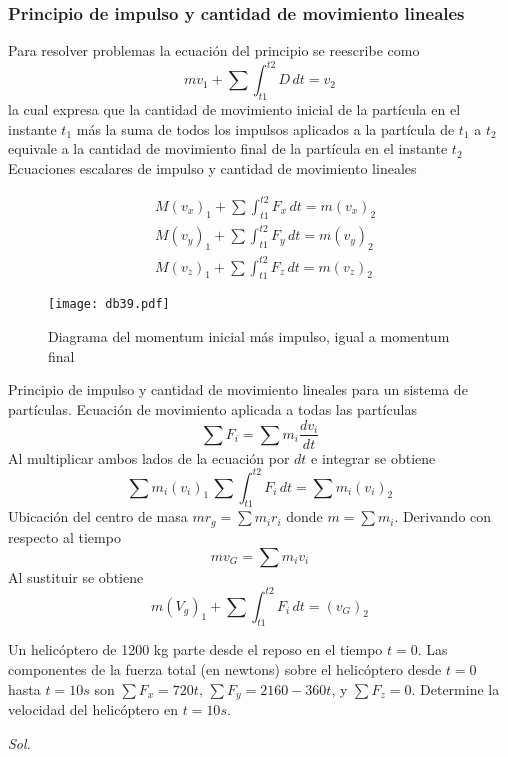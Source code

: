 \subsubsection{Principio de impulso y cantidad de movimiento lineales}
Para resolver
problemas la ecuación del principio se reescribe como
\begin{equation}
    mv_1 +\sum \int_{t1}^{t2}D\,dt = v_2
\end{equation}
la cual expresa que la cantidad de movimiento inicial de la partícula en el
instante $t_1$ más la suma de todos los impulsos aplicados a la partícula de $t_1$ a
$t_2$ equivale a la cantidad de movimiento final de la partícula en el instante $t_2$
Ecuaciones escalares de impulso y cantidad de
movimiento lineales

\begin{align}
    &M\left(v_x\right)_1 +\sum \int_{t1}^{t2}F_x\,dt = m\left(v_x\right)_2\\
    &M\left(v_y\right)_1 +\sum \int_{t1}^{t2}F_y\,dt = m\left(v_y\right)_2\\
    &M\left(v_z\right)_1 +\sum \int_{t1}^{t2}F_z\,dt = m\left(v_z\right)_2
\end{align}

\begin{figure}[h!]
\centering
  \texttt{[image: db39.pdf]}
  \caption{Diagrama del momentum inicial más impulso, igual a momentum final}
  \label{db39}
\end{figure}
Principio de impulso y cantidad de movimiento lineales para un sistema de
partículas. Ecuación de movimiento aplicada a todas las partículas
\begin{equation}
    \sum F_i=\sum m_i \frac{dv_i}{dt}
\end{equation}
Al multiplicar ambos lados de la ecuación por $dt$ e integrar se obtiene
\begin{equation*}
    \sum m_i(v_i)_1\, \sum \int_{t1}^{t2}F_i\,dt =\sum m_i(v_i)_2
\end{equation*}
Ubicación del centro de masa $mr_g=\sum m_ir_i$ donde $m=\sum m_i$. Derivando con respecto al tiempo
\begin{equation*}
    mv_G =\sum m_iv_i
\end{equation*}
Al sustituir se obtiene
\begin{equation*}
    m(V_g)_1 +\sum \int_{t1}^{t2}F_i\,dt = (v_G)_2
\end{equation*}
\begin{example}
    Un helicóptero de 1200 kg parte desde el reposo en el tiempo $t=0$. Las
componentes de la fuerza total (en newtons) sobre el helicóptero desde $t=0$ hasta
$t=10s$ son $\sum F_x=720t,\, \sum F_y=2160-360t$, y $\sum F_z=0$. Determine la velocidad
del helicóptero en $t= 10 s$.
\end{example}
\textit{ Sol. }

